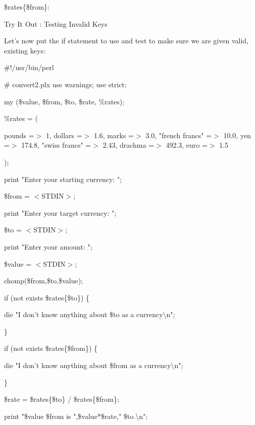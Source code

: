 \documentclass[a4paper,11pt]{book}
\begin{document}
\noindent \$rates\{\$from\}:

\noindent 

\noindent Try It Out : Testing Invalid Keys

\noindent 

\noindent Let's now put the if statement to use and test to make sure we are given valid, existing keys:

\noindent 

\noindent \#!/usr/bin/perl

\noindent \# convert2.plx use warnings; use strict;

\noindent 

\noindent 

\noindent my (\$value, \$from, \$to, \$rate, \%rates);

\noindent \%rates = (

\noindent pounds =$>$ 1, dollars =$>$ 1.6, marks =$>$ 3.0, "french francs" =$>$ 10.0, yen =$>$ 174.8, "swiss francs"  =$>$ 2.43, drachma =$>$ 492.3, euro =$>$ 1.5

\noindent );

\noindent 

\noindent print "Enter your starting currency: ";

\noindent \$from = $<$STDIN$>$;

\noindent print "Enter your target currency: ";

\noindent \$to = $<$STDIN$>$;

\noindent print "Enter your amount: ";

\noindent \$value = $<$STDIN$>$;

\noindent 

\noindent chomp(\$from,\$to,\$value);

\noindent 

\noindent if (not exists \$rates\{\$to\}) \{

\noindent die "I don't know anything about \$to as a currency\textbackslash n";

\noindent \}

\noindent if (not exists \$rates\{\$from\}) \{

\noindent die "I don't know anything about \$from as a currency\textbackslash n";

\noindent \}

\noindent 

\noindent \$rate = \$rates\{\$to\} / \$rates\{\$from\};

\noindent 

\noindent print "\$value \$from is ",\$value*\$rate," \$to.\textbackslash n";
\end{document}
